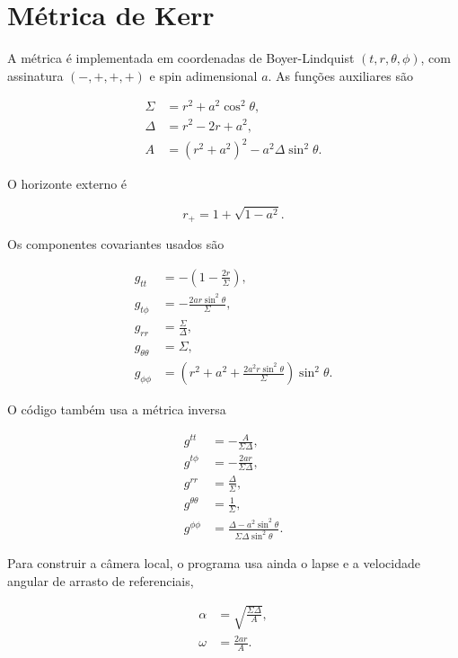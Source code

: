 \documentclass[11pt,a4paper]{article}
\begin{document}
\section{Métrica de Kerr}

A métrica é implementada em coordenadas de Boyer-Lindquist
$(t,r,\theta,\phi)$, com assinatura $(-,+,+,+)$ e spin adimensional $a$.
As funções auxiliares são

\begin{align}
  \Sigma &= r^2 + a^2\cos^2\theta,\\
  \Delta &= r^2 - 2r + a^2,\\
  A &= (r^2+a^2)^2 - a^2\Delta\sin^2\theta.
\end{align}

O horizonte externo é

\begin{equation}
  r_+ = 1+\sqrt{1-a^2}.
\end{equation}

Os componentes covariantes usados são

\begin{align}
  g_{tt} &= -\left(1-\frac{2r}{\Sigma}\right),\\
  g_{t\phi} &= -\frac{2ar\sin^2\theta}{\Sigma},\\
  g_{rr} &= \frac{\Sigma}{\Delta},\\
  g_{\theta\theta} &= \Sigma,\\
  g_{\phi\phi} &=
  \left(r^2+a^2+\frac{2a^2r\sin^2\theta}{\Sigma}\right)\sin^2\theta.
\end{align}

O código também usa a métrica inversa

\begin{align}
  g^{tt} &= -\frac{A}{\Sigma\Delta},\\
  g^{t\phi} &= -\frac{2ar}{\Sigma\Delta},\\
  g^{rr} &= \frac{\Delta}{\Sigma},\\
  g^{\theta\theta} &= \frac{1}{\Sigma},\\
  g^{\phi\phi} &= \frac{\Delta-a^2\sin^2\theta}
  {\Sigma\Delta\sin^2\theta}.
\end{align}

Para construir a câmera local, o programa usa ainda o lapse e a velocidade
angular de arrasto de referenciais,

\begin{align}
  \alpha &= \sqrt{\frac{\Sigma\Delta}{A}},\\
  \omega &= \frac{2ar}{A}.
\end{align}
\end{document}
